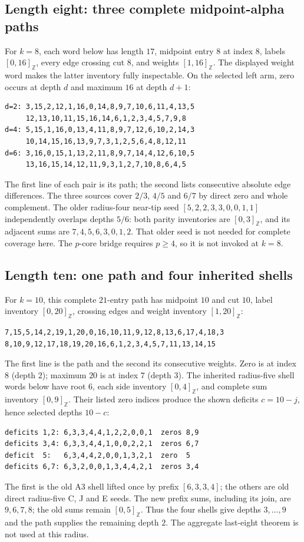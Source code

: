 \documentclass[11pt,a4paper]{article}
\theoremstyle{definition}\newtheorem{definition}[theorem]{Definition}
\theoremstyle{remark}\newtheorem{remark}[theorem]{Remark}
\newcommand{\ints}[2]{[#1,#2]_{\mathbb Z}}
\begin{document}
\subsection{Length eight: three complete midpoint-alpha paths}
For $k=8$, each word below has length $17$, midpoint entry $8$ at
index $8$, labels $\ints0{16}$, every edge crossing cut $8$, and
weights $\ints1{16}$. The displayed weight word makes the latter
inventory fully inspectable. On the selected left arm, zero occurs at
depth $d$ and maximum $16$ at depth $d+1$:
\begin{verbatim}
d=2: 3,15,2,12,1,16,0,14,8,9,7,10,6,11,4,13,5
     12,13,10,11,15,16,14,6,1,2,3,4,5,7,9,8
d=4: 5,15,1,16,0,13,4,11,8,9,7,12,6,10,2,14,3
     10,14,15,16,13,9,7,3,1,2,5,6,4,8,12,11
d=6: 3,16,0,15,1,13,2,11,8,9,7,14,4,12,6,10,5
     13,16,15,14,12,11,9,3,1,2,7,10,8,6,4,5
\end{verbatim}
The first line of each pair is its path; the second lists consecutive
absolute edge differences. The three sources cover $2/3$, $4/5$ and
$6/7$ by direct zero and whole complement. The older radius-four
near-tip seed $[5,2,2,3,3,0,0,1,1]$ independently overlaps depths
$5/6$: both parity inventories are $\ints03$, and its adjacent sums
are $7,4,5,6,3,0,1,2$. That older seed is not needed for complete
coverage here. The $p$-core bridge requires $p\ge4$, so it is not
invoked at $k=8$.

\subsection{Length ten: one path and four inherited shells}
For $k=10$, this complete $21$-entry path has midpoint $10$ and cut
$10$, label inventory $\ints0{20}$, crossing edges and weight inventory
$\ints1{20}$:
\begin{verbatim}
7,15,5,14,2,19,1,20,0,16,10,11,9,12,8,13,6,17,4,18,3
8,10,9,12,17,18,19,20,16,6,1,2,3,4,5,7,11,13,14,15
\end{verbatim}
The first line is the path and the second its consecutive weights.
Zero is at index $8$ (depth $2$); maximum $20$ is at index $7$
(depth $3$). The inherited radius-five shell words below have root
$6$, each side inventory $\ints04$, and complete sum inventory
$\ints09$. Their listed zero indices produce the shown deficits
$c=10-j$, hence selected depths $10-c$:
\begin{verbatim}
deficits 1,2: 6,3,3,4,4,1,2,2,0,0,1  zeros 8,9
deficits 3,4: 6,3,3,4,4,1,0,0,2,2,1  zeros 6,7
deficit  5:   6,3,4,4,2,0,0,1,3,2,1  zero  5
deficits 6,7: 6,3,2,0,0,1,3,4,4,2,1  zeros 3,4
\end{verbatim}
The first is the old A3 shell lifted once by prefix
$[6,3,3,4]$; the others are old direct radius-five C, J and E
seeds. The new prefix sums, including its join, are $9,6,7,8$;
the old sums remain $\ints05$. Thus the four shells give depths
$3,\ldots,9$ and the path supplies the remaining depth $2$.
The aggregate last-eight theorem is not used at this radius.
\end{document}
